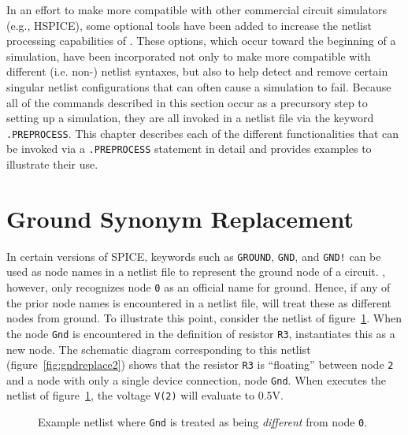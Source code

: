 In an effort to make \Xyce{} more compatible with other commercial circuit 
simulators (e.g., HSPICE), some optional tools have been added to increase the netlist processing capabilities of \Xyce{}.  These options, which occur toward
the beginning of a simulation, have been incorporated not only to make 
\Xyce{} more compatible with different (i.e. non-\Xyce{}) netlist syntaxes, but also 
to help detect and remove certain singular netlist configurations that can often 
cause a \Xyce{} simulation to fail.  Because all of the commands described 
in this section occur as a precursory step to setting up a \Xyce{} simulation, they are 
all invoked in a netlist file via the keyword \texttt{.PREPROCESS}.  This 
chapter describes each of the different functionalities that can be invoked 
via a \texttt{.PREPROCESS} statement in detail and provides examples to illustrate 
their use.




\section{Ground Synonym Replacement}
\label{PP_gndsyn}
In certain versions of SPICE, keywords such as \texttt{GROUND}, \texttt{GND}, and 
\texttt{GND!} can be used as node names in a netlist file to represent the ground 
node of a circuit.  \Xyce{}, however, only recognizes node \texttt{0} as an official
name for ground.  Hence, if any of the prior node names is encountered in a 
netlist file, \Xyce{} will treat these as different nodes from ground.  To 
illustrate this point, consider the netlist of figure\ \ref{fig:nlgndrepl2}.  
When the node \texttt{Gnd} is encountered in the definition of resistor \texttt{R3}, 
\Xyce{} instantiates this as a new node.  The schematic diagram corresponding to
this netlist (figure\ \ref{fig:gndreplace2}) shows that the resistor 
\texttt{R3} is ``floating'' between node \texttt{2} and a node with only a 
single device connection, node \texttt{Gnd}.  When \Xyce{} executes the netlist of figure\ 
\ref{fig:nlgndrepl2}, the voltage \texttt{V(2)} will evaluate to 0.5V.  

\begin{figure}[htbp]
\begin{centering}
\caption[Example netlist -- \texttt{Gnd} treated {\em different}
from node \texttt{0}.] {Example netlist where \texttt{Gnd} is treated as being {\em different}
from node \texttt{0}.}
\label{fig:nlgndrepl2}
\end{centering}
\end{figure}

